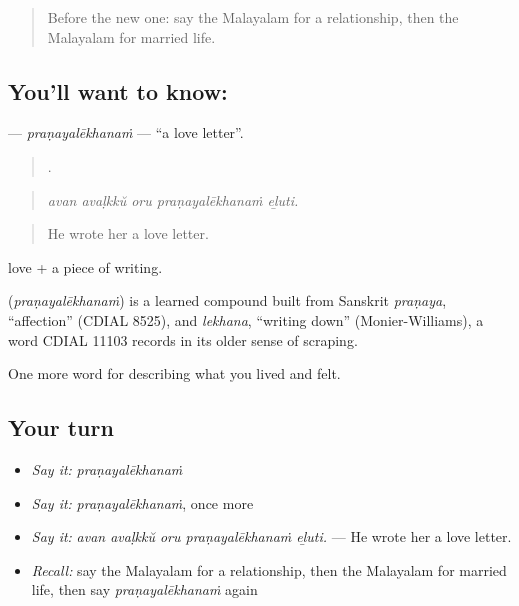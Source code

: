\label{lesson:ML-C552-pranayalekhanam}



\begin{quote}
Before the new one: say the Malayalam for a relationship, then the Malayalam for married life.
\end{quote}

\subsection*{You'll want to know: }
\textbf{} — \emph{praṇayalēkhanaṁ} — \textquotedblleft{}a love letter\textquotedblright{}.

\begin{quote}
    .
\end{quote}

\begin{quote}
\emph{avan avaḷkkŭ oru praṇayalēkhanaṁ eḻuti.}
\end{quote}

\begin{quote}
He wrote her a love letter.
\end{quote}

 love +  a piece of writing.

\begin{cousinweb}
\textbf{} (\emph{praṇayalēkhanaṁ}) is a learned compound built from Sanskrit \emph{praṇaya}, \textquotedblleft{}affection\textquotedblright{} (CDIAL 8525), and \emph{lekhana}, \textquotedblleft{}writing down\textquotedblright{} (Monier-Williams), a word CDIAL 11103 records in its older sense of scraping.
\end{cousinweb}

\begin{grammarlens}[title={What you've built}]
One more word for describing what you lived and felt.
\end{grammarlens}

\subsection*{Your turn}
\begin{itemize}
\raggedright
  \item \emph{Say it:} \emph{praṇayalēkhanaṁ}
  \item \emph{Say it:} \emph{praṇayalēkhanaṁ}, once more
  \item \emph{Say it:} \emph{avan avaḷkkŭ oru praṇayalēkhanaṁ eḻuti.} — He wrote her a love letter.
  \item \emph{Recall:} say the Malayalam for a relationship, then the Malayalam for married life, then say \emph{praṇayalēkhanaṁ} again
\end{itemize}

